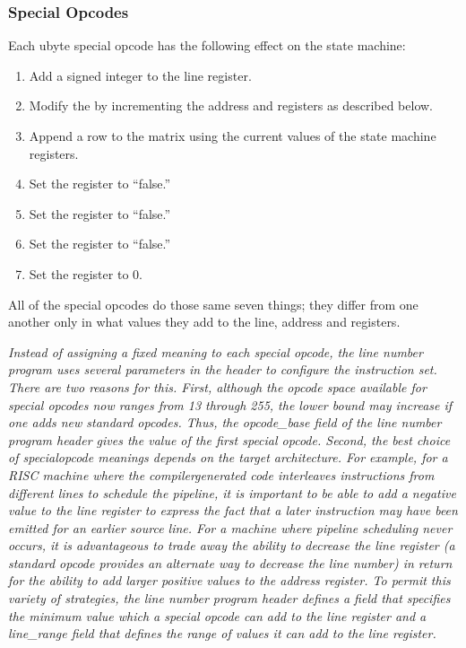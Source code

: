 \subsubsection{Special Opcodes} 
\label{chap:specialopcodes}
Each ubyte special opcode has the following effect on the state machine:

\begin{enumerate}[1.]

\item  Add a signed integer to the line register.

\item  Modify the  by incrementing the
address and  registers as described below.

\item  Append a row to the matrix using the current values
of the state machine registers.

\item  Set the  register to ``false.'' 
\item  Set the  register to ``false.''
\item  Set the  register to ``false.''
\item  Set the  register to 0.

\end{enumerate}

All of the special opcodes do those same seven things; they
differ from one another only in what values they add to the
line, address and  registers.


\textit{Instead of assigning a fixed meaning to each special opcode,
the line number program uses several parameters in the header
to configure the instruction set. There are two reasons
for this.  First, although the opcode space available for
special opcodes now ranges from 13 through 255, the lower
bound may increase if one adds new standard opcodes. Thus, the
opcode\_base field of the line number program header gives the
value of the first special opcode. Second, the best choice of
special\dash opcode meanings depends on the target architecture. For
example, for a RISC machine where the compiler\dash generated code
interleaves instructions from different lines to schedule
the pipeline, it is important to be able to add a negative
value to the line register to express the fact that a later
instruction may have been emitted for an earlier source
line. For a machine where pipeline scheduling never occurs,
it is advantageous to trade away the ability to decrease
the line register (a standard opcode provides an alternate
way to decrease the line number) in return for the ability
to add larger positive values to the address register. To
permit this variety of strategies, the line number program
header defines a 
field that specifies the minimum
value which a special opcode can add to the line register
and a line\_range field that defines the range of values it
can add to the line register.}


